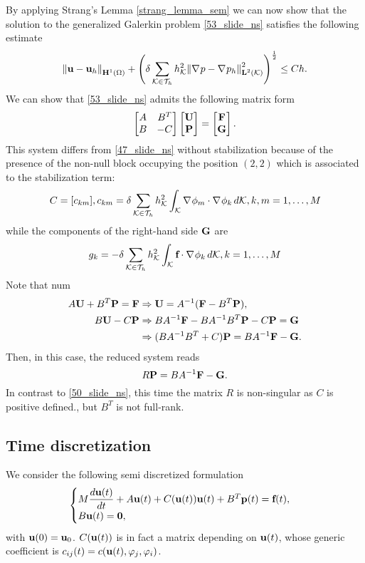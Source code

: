 By applying Strang's Lemma \eqref{strang_lemma_sem} we can now show that the solution to the generalized Galerkin problem \eqref{53_slide_ns} satisfies the following estimate 
\[
    \norm{\textbf{u} - \textbf{u}_h}_{\textbf{H}^1(\Omega)} + \left( \delta \sum_{\mathcal{K}\in\mathcal{T}_h} h^2_{\mathcal{K}} \norm{\nabla\mspace{1mu} p - \nabla\mspace{1mu} p_h}_{\textbf{L}^2(\mathcal{K})}^2 \right)^{\frac{1}{2}} \leq Ch.
\]
We can show that \eqref{53_slide_ns} admits the following matrix form
\begin{equation}
    \left[ \begin{matrix}
        A & B^T \\
        B & -C
    \end{matrix} \right] \left[ \begin{matrix}
        \textbf{U} \\ \textbf{P}
    \end{matrix} \right] = \left[ \begin{matrix}
        \textbf{F} \\ \textbf{G}
    \end{matrix} \right].
    \label{56_slide_ns}
\end{equation}
This system differs from \eqref{47_slide_ns} without stabilization because of the presence of the non-null block occupying the position \((2,2)\) which is associated to the stabilization term:
\[
    C = [c_{km}], c_{km} = \delta \sum_\eit h^2_\element \int_\element \grad \oldphi_m \cdot \grad \oldphi_k \, d\element, k,m = 1,\ldots, M
\]
while the components of the right-hand side \(\textbf{G}\) are 
\[
    g_k = -\delta \sum_\eit h^2_\element \int_\element \vect{f} \cdot \grad \oldphi_k \, d\element, k = 1,\ldots, M
\]
Note that num
\begin{align}
    A\textbf{U} + B^T\textbf{P} = \textbf{F} &\Rightarrow \textbf{U} = A^{-1} (\textbf{F} - B^T\textbf{P}),\\
    B\textbf{U} - C\textbf{P} & \Rightarrow BA^{-1} \textbf{F} - BA^{-1}B^T \textbf{P} -C\textbf{P} = \textbf{G} \\
    &\Rightarrow (BA^{-1}B^T + C)\textbf{P} = BA^{-1} \textbf{F} - \textbf{G}.
\end{align}
Then, in this case, the reduced system reads 
\[
    R\textbf{P} = BA^{-1} \textbf{F} - \textbf{G}.
\]
In contrast to \eqref{50_slide_ns}, this time the matrix \(R\) is non-singular as \(C\) is positive defined., but \(B^T\) is not full-rank.
\subsection{Time discretization}
We consider the following semi discretized formulation
\begin{equation}
    \begin{cases}
        M\dfrac{d\textbf{u}(t)}{dt} + A\textbf{u}(t) + C(\textbf{u}(t))\textbf{u}(t) + B^T\textbf{p}(t) = \textbf{f}(t) ,\\
        B\textbf{u}(t) = \textbf{0},
        \label{58_slide_ns}
    \end{cases}
\end{equation}
with \(\textbf{u}(0) = \textbf{u}_0\). \(C(\textbf{u}(t))\) is in fact a matrix depending on \(\textbf{u}(t)\), whose generic coefficient is \(c_{ij}(t) = c(\textbf{u}(t), \varphi_j, \varphi_i)\).

